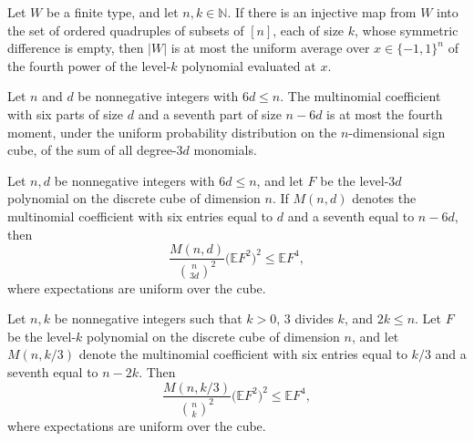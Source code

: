 \begin{theorem}
\label{FABL.natCard_le_fourthMoment_levelKPolynomial_of_injective}
\leanok
{}
Let $W$ be a finite type, and let $n,k\in\mathbb N$. If there is an injective map from
$W$ into the set of ordered quadruples of subsets of $[n]$, each of size $k$, whose
symmetric difference is empty, then $|W|$ is at most the uniform average over
$x\in\{−1,1\}^n$ of the fourth power of the level-$k$ polynomial evaluated at $x$.
\end{theorem}

\begin{theorem}
\label{FABL.sixBlockMultinomial_le_fourthMoment_levelKPolynomial}
\leanok
{}
Let $n$ and $d$ be nonnegative integers with $6d\le n$. The multinomial coefficient
with six parts of size $d$ and a seventh part of size $n-6d$ is at most the fourth
moment, under the uniform probability distribution on the $n$-dimensional sign cube, of
the sum of all degree-$3d$ monomials.
\end{theorem}

\begin{theorem}
\label{FABL.exercise9_3_fourthMoment_lower_bound}
\leanok
{}
Let $n,d$ be nonnegative integers with $6d\leq n$, and let $F$ be the level-$3d$
polynomial on the discrete cube of dimension $n$. If $M(n,d)$ denotes the multinomial
coefficient with six entries equal to $d$ and a seventh equal to $n-6d$, then
\[
\frac{M(n,d)}{\binom{n}{3d}^{2}}\bigl(\mathbb{E}F^2\bigr)^2\leq \mathbb{E}F^4,
\]
where expectations are uniform over the cube.
\end{theorem}

\begin{theorem}
\label{FABL.exercise9_3_fourthMoment_lower_bound_of_dvd}
\leanok
{}
Let $n,k$ be nonnegative integers such that $k>0$, $3$ divides $k$, and $2k\leq n$. Let
$F$ be the level-$k$ polynomial on the discrete cube of dimension $n$, and let
$M(n,k/3)$ denote the multinomial coefficient with six entries equal to $k/3$ and a
seventh equal to $n-2k$. Then
\[
\frac{M(n,k/3)}{\binom{n}{k}^{2}}\bigl(\mathbb{E}F^2\bigr)^2\leq \mathbb{E}F^4,
\]
where expectations are uniform over the cube.
\end{theorem}
